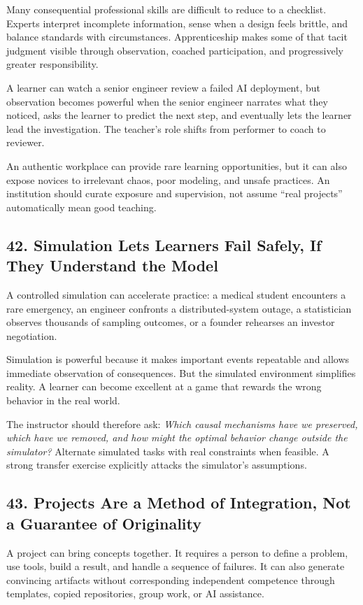 Many consequential professional skills are difficult to reduce to a checklist. Experts interpret incomplete information, sense when a design feels brittle, and balance standards with circumstances. Apprenticeship makes some of that tacit judgment visible through observation, coached participation, and progressively greater responsibility.

A learner can watch a senior engineer review a failed AI deployment, but observation becomes powerful when the senior engineer narrates what they noticed, asks the learner to predict the next step, and eventually lets the learner lead the investigation. The teacher's role shifts from performer to coach to reviewer.

An authentic workplace can provide rare learning opportunities, but it can also expose novices to irrelevant chaos, poor modeling, and unsafe practices. An institution should curate exposure and supervision, not assume ``real projects'' automatically mean good teaching.

\subsection*{42. Simulation Lets Learners Fail Safely, If They Understand the Model}

A controlled simulation can accelerate practice: a medical student encounters a rare emergency, an engineer confronts a distributed-system outage, a statistician observes thousands of sampling outcomes, or a founder rehearses an investor negotiation.

Simulation is powerful because it makes important events repeatable and allows immediate observation of consequences. But the simulated environment simplifies reality. A learner can become excellent at a game that rewards the wrong behavior in the real world.

The instructor should therefore ask: \emph{Which causal mechanisms have we preserved, which have we removed, and how might the optimal behavior change outside the simulator?} Alternate simulated tasks with real constraints when feasible. A strong transfer exercise explicitly attacks the simulator's assumptions.

\subsection*{43. Projects Are a Method of Integration, Not a Guarantee of Originality}

A project can bring concepts together. It requires a person to define a problem, use tools, build a result, and handle a sequence of failures. It can also generate convincing artifacts without corresponding independent competence through templates, copied repositories, group work, or AI assistance.

